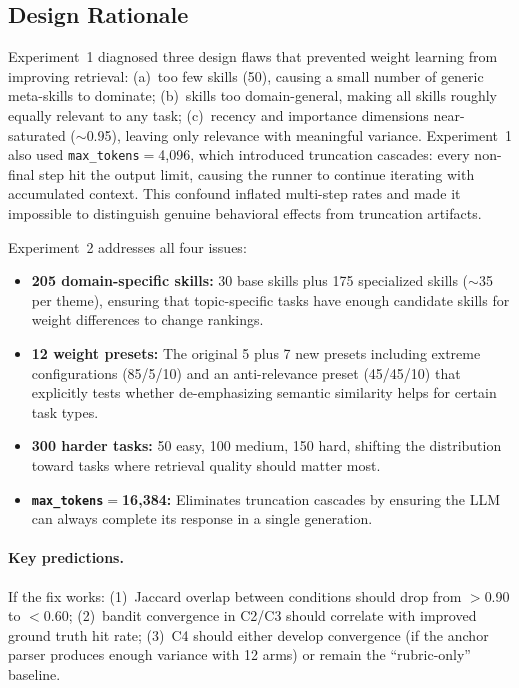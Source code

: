 
\subsection{Design Rationale}

Experiment~1 diagnosed three design flaws that prevented weight learning from improving retrieval:
(a)~too few skills (50), causing a small number of generic meta-skills to dominate;
(b)~skills too domain-general, making all skills roughly equally relevant to any task;
(c)~recency and importance dimensions near-saturated (${\sim}$0.95), leaving only relevance with meaningful variance.
Experiment~1 also used \texttt{max\_tokens}$=$4{,}096, which introduced truncation cascades: every non-final step hit the output limit, causing the runner to continue iterating with accumulated context.
This confound inflated multi-step rates and made it impossible to distinguish genuine behavioral effects from truncation artifacts.

Experiment~2 addresses all four issues:
\begin{itemize}
\item \textbf{205 domain-specific skills:} 30 base skills plus 175 specialized skills (${\sim}$35 per theme), ensuring that topic-specific tasks have enough candidate skills for weight differences to change rankings.
\item \textbf{12 weight presets:} The original 5 plus 7 new presets including extreme configurations (85/5/10) and an anti-relevance preset (45/45/10) that explicitly tests whether de-emphasizing semantic similarity helps for certain task types.
\item \textbf{300 harder tasks:} 50 easy, 100 medium, 150 hard, shifting the distribution toward tasks where retrieval quality should matter most.
\item \textbf{\texttt{max\_tokens}$=$16{,}384:} Eliminates truncation cascades by ensuring the LLM can always complete its response in a single generation.
\end{itemize}

\paragraph{Key predictions.}
If the fix works: (1)~Jaccard overlap between conditions should drop from $>$0.90 to $<$0.60; (2)~bandit convergence in C2/C3 should correlate with improved ground truth hit rate; (3)~C4 should either develop convergence (if the anchor parser produces enough variance with 12 arms) or remain the ``rubric-only'' baseline.

